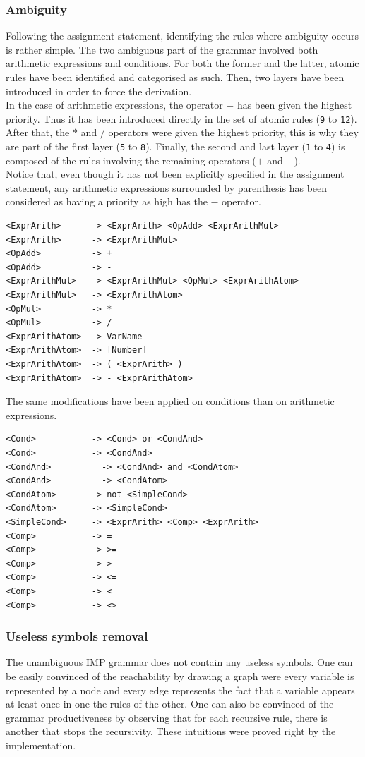 \documentclass[a4paper,11pt]{article}
\begin{document}
    \subsubsection{Ambiguity}
      Following the assignment statement, identifying the rules where ambiguity occurs is rather simple. The two ambiguous part of the grammar involved both arithmetic expressions and conditions. For both the former and the latter, atomic rules have been identified and categorised as such. Then, two layers have been introduced in order to force the derivation.\\
      In the case of arithmetic expressions, the operator $-$ has been given the highest priority. Thus it has been introduced directly in the set of atomic rules (\verb|9| to \verb|12|). After that, the $*$ and $/$ operators were given the highest priority, this is why they are part of the first layer (\verb|5| to \verb|8|). Finally, the second and last layer (\verb|1| to \verb|4|) is composed of the rules involving the remaining operators ($+$ and $-$).\\
      Notice that, even though it has not been explicitly specified in the assignment statement, any arithmetic expressions surrounded by parenthesis has been considered as having a priority as high has the $-$ operator.
      \begin{lstlisting}
<ExprArith>	     -> <ExprArith> <OpAdd> <ExprArithMul> 
<ExprArith>	     -> <ExprArithMul> 
<OpAdd>	         -> + 
<OpAdd>	         -> - 
<ExprArithMul>	 -> <ExprArithMul> <OpMul> <ExprArithAtom> 
<ExprArithMul>	 -> <ExprArithAtom> 
<OpMul>	         -> * 
<OpMul>	         -> / 
<ExprArithAtom>	 -> VarName 
<ExprArithAtom>	 -> [Number] 
<ExprArithAtom>	 -> ( <ExprArith> ) 
<ExprArithAtom>	 -> - <ExprArithAtom>\end{lstlisting}
      The same modifications have been applied on conditions than on arithmetic expressions.
      \begin{lstlisting}
<Cond>	         -> <Cond> or <CondAnd> 
<Cond>	         -> <CondAnd> 
<CondAnd>	       -> <CondAnd> and <CondAtom> 
<CondAnd>	       -> <CondAtom> 
<CondAtom>	     -> not <SimpleCond> 
<CondAtom>	     -> <SimpleCond> 
<SimpleCond>     -> <ExprArith> <Comp> <ExprArith> 
<Comp>	         -> = 
<Comp>	         -> >= 
<Comp>	         -> >  
<Comp>	         -> <=  
<Comp>	         -> <  
<Comp>	         -> <>\end{lstlisting}

    \subsubsection{Useless symbols removal}
      The unambiguous IMP grammar does not contain any useless symbols. One can be easily convinced of the reachability by drawing a graph were every variable is represented by a node and every edge represents the fact that a variable appears at least once in one the rules of the other. One can also be convinced of the grammar productiveness by observing that for each recursive rule, there is another that stops the recursivity. These intuitions were proved right by the implementation.
      
\end{document}
